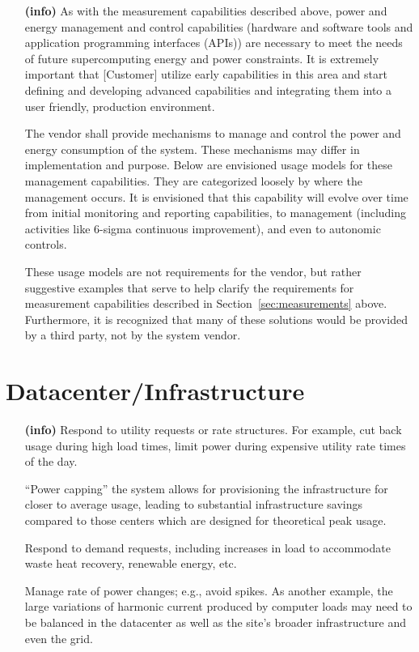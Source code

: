 \begin{itemize}
\item[\textbf{(info)}]
As with the measurement capabilities described above, power and energy management and control 
capabilities (hardware and software tools and application programming interfaces (APIs)) are 
necessary to meet the needs of future supercomputing energy and power constraints. It is 
extremely important that [Customer] utilize early capabilities in this area and start 
defining and developing advanced capabilities and integrating them into a user friendly, 
production environment.  

The vendor shall provide mechanisms to manage and control the power and energy 
consumption of the system. These mechanisms may differ in implementation and purpose.  
Below are envisioned usage models for these management capabilities.  They are categorized 
loosely by where the management occurs. It is envisioned that this capability will evolve 
over time from initial monitoring and reporting capabilities, to management (including 
activities like 6-sigma continuous improvement), and even to autonomic controls.   

These usage models are not requirements for the vendor, but rather suggestive 
examples that serve to help clarify the requirements for measurement capabilities 
described in Section~\ref{sec:measurements} above. Furthermore, it is recognized that 
many of these solutions would be provided by a third party, not by the system vendor.  
\end{itemize}

\section{Datacenter/Infrastructure}
\begin{itemize}
\item[\textbf{(info)}]
Respond to utility requests or rate structures. For example, cut back usage 
during high load times, limit power during expensive utility rate times of the day. 

 ``Power capping'' the system allows for provisioning the infrastructure for closer 
to average usage, leading to substantial infrastructure savings compared to those 
centers which are designed for theoretical peak usage.  

Respond to demand requests, including increases in load to accommodate waste 
heat recovery, renewable energy, etc.

Manage rate of power changes; e.g., avoid spikes.  As another example, the large variations of 
harmonic current produced by computer loads may need to be balanced in the datacenter as well 
as the site's broader infrastructure and even the grid.  
\end{itemize}

